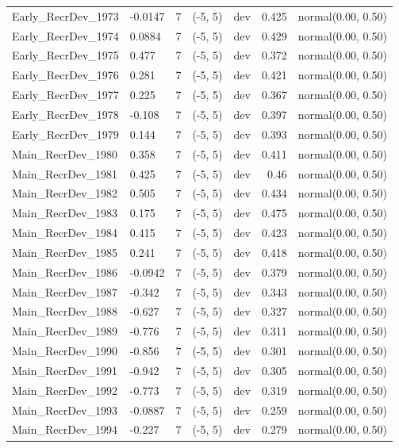 \documentclass[
]{scrartcl}
\begin{document}
\begin{landscape}
\begin{longtable}{llrllrl}
Early\_RecrDev\_1973 & -0.0147 & 7 & (-5, 5) & dev & 0.425 & normal(0.00, 0.50) \\ 
Early\_RecrDev\_1974 & 0.0884 & 7 & (-5, 5) & dev & 0.429 & normal(0.00, 0.50) \\ 
Early\_RecrDev\_1975 & 0.477 & 7 & (-5, 5) & dev & 0.372 & normal(0.00, 0.50) \\ 
Early\_RecrDev\_1976 & 0.281 & 7 & (-5, 5) & dev & 0.421 & normal(0.00, 0.50) \\ 
Early\_RecrDev\_1977 & 0.225 & 7 & (-5, 5) & dev & 0.367 & normal(0.00, 0.50) \\ 
Early\_RecrDev\_1978 & -0.108 & 7 & (-5, 5) & dev & 0.397 & normal(0.00, 0.50) \\ 
Early\_RecrDev\_1979 & 0.144 & 7 & (-5, 5) & dev & 0.393 & normal(0.00, 0.50) \\ 
Main\_RecrDev\_1980 & 0.358 & 7 & (-5, 5) & dev & 0.411 & normal(0.00, 0.50) \\ 
Main\_RecrDev\_1981 & 0.425 & 7 & (-5, 5) & dev & 0.46 & normal(0.00, 0.50) \\ 
Main\_RecrDev\_1982 & 0.505 & 7 & (-5, 5) & dev & 0.434 & normal(0.00, 0.50) \\ 
Main\_RecrDev\_1983 & 0.175 & 7 & (-5, 5) & dev & 0.475 & normal(0.00, 0.50) \\ 
Main\_RecrDev\_1984 & 0.415 & 7 & (-5, 5) & dev & 0.423 & normal(0.00, 0.50) \\ 
Main\_RecrDev\_1985 & 0.241 & 7 & (-5, 5) & dev & 0.418 & normal(0.00, 0.50) \\ 
Main\_RecrDev\_1986 & -0.0942 & 7 & (-5, 5) & dev & 0.379 & normal(0.00, 0.50) \\ 
Main\_RecrDev\_1987 & -0.342 & 7 & (-5, 5) & dev & 0.343 & normal(0.00, 0.50) \\ 
Main\_RecrDev\_1988 & -0.627 & 7 & (-5, 5) & dev & 0.327 & normal(0.00, 0.50) \\ 
Main\_RecrDev\_1989 & -0.776 & 7 & (-5, 5) & dev & 0.311 & normal(0.00, 0.50) \\ 
Main\_RecrDev\_1990 & -0.856 & 7 & (-5, 5) & dev & 0.301 & normal(0.00, 0.50) \\ 
Main\_RecrDev\_1991 & -0.942 & 7 & (-5, 5) & dev & 0.305 & normal(0.00, 0.50) \\ 
Main\_RecrDev\_1992 & -0.773 & 7 & (-5, 5) & dev & 0.319 & normal(0.00, 0.50) \\ 
Main\_RecrDev\_1993 & -0.0887 & 7 & (-5, 5) & dev & 0.259 & normal(0.00, 0.50) \\ 
Main\_RecrDev\_1994 & -0.227 & 7 & (-5, 5) & dev & 0.279 & normal(0.00, 0.50) \\ 

\end{longtable}
\end{landscape}
\end{document}
